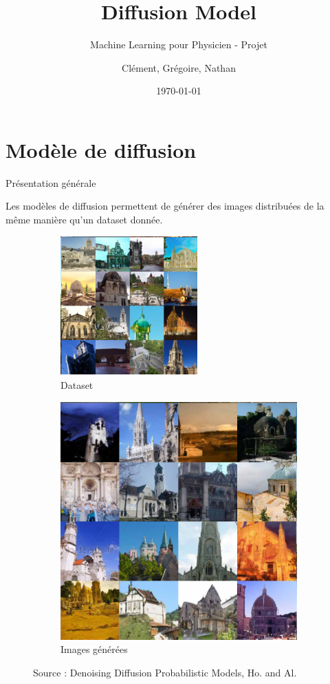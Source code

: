 \documentclass{beamer}
\begin{document}
	
	\title{Diffusion Model}
	\subtitle{Machine Learning pour Physicien - Projet}
	\author{Clément, Grégoire, Nathan}
	\date{\today}
	
	\maketitle
	
	\section{Modèle de diffusion}
	
	\begin{frame}{Présentation générale}
		
		Les modèles de diffusion permettent de générer des images distribuées \alert{de la même manière} qu'un dataset donnée.
		
		\begin{figure}
			\centering
			\begin{subfigure}[b]{0.4\textwidth}
				\centering
				\includegraphics[scale=0.36]{imgs/Church_dataset.png}
				\caption*{Dataset}
			\end{subfigure}
			\begin{subfigure}[b]{0.4\textwidth}
				\centering
				\includegraphics[scale=0.15]{imgs/Church_generated.png}
				\caption*{Images générées}
			\end{subfigure}
			\hfill
			\caption{Source : Denoising Diffusion Probabilistic Models, Ho. and Al.}
		\end{figure}
		

\end{frame}
\end{document}

